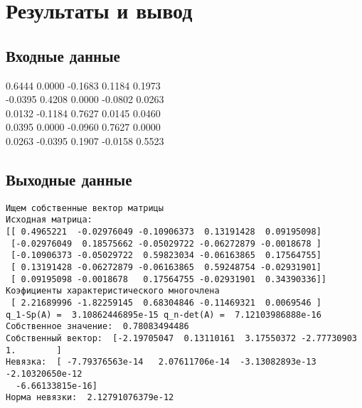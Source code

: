 \documentclass[11.4pt]{article}
\begin{document}
\section{Результаты и вывод}
	\subsection{Входные данные}
		0.6444 0.0000 -0.1683 0.1184 0.1973\\
		-0.0395 0.4208 0.0000 -0.0802 0.0263\\
		0.0132 -0.1184 0.7627 0.0145 0.0460\\
		0.0395 0.0000 -0.0960 0.7627 0.0000\\
		0.0263 -0.0395 0.1907 -0.0158 0.5523\\
	\subsection{Выходные данные}
\begin{verbatim}
Ищем собственные вектор матрицы
Исходная матрица:
[[ 0.4965221  -0.02976049 -0.10906373  0.13191428  0.09195098]
 [-0.02976049  0.18575662 -0.05029722 -0.06272879 -0.0018678 ]
 [-0.10906373 -0.05029722  0.59823034 -0.06163865  0.17564755]
 [ 0.13191428 -0.06272879 -0.06163865  0.59248754 -0.02931901]
 [ 0.09195098 -0.0018678   0.17564755 -0.02931901  0.34390336]]
Коэфициенты характеристического многочлена
 [ 2.21689996 -1.82259145  0.68304846 -0.11469321  0.0069546 ]
q_1-Sp(A) =  3.10862446895e-15 q_n-det(A) =  7.12103986888e-16
Собственное значение:  0.78083494486
Собственный вектор:  [-2.19705047  0.13110161  3.17550372 -2.77730903  1.        ]
Невязка:  [ -7.79376563e-14   2.07611706e-14  -3.13082893e-13  -2.10320650e-12
  -6.66133815e-16]
Норма невязки:  2.12791076379e-12
 \end{verbatim}
\end{document}

